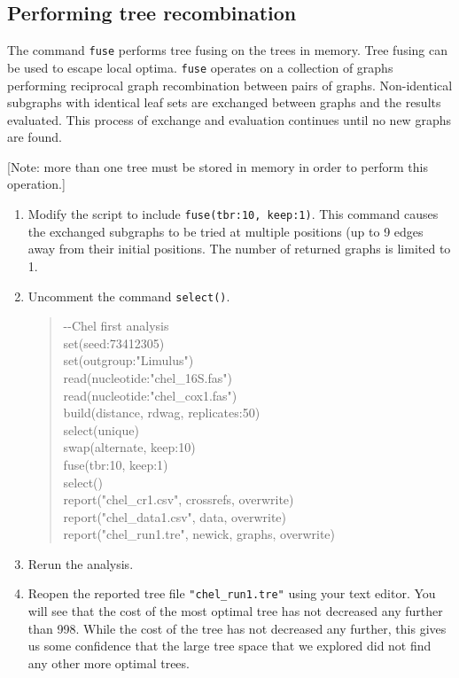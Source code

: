\documentclass[]{article}
\begin{document}
\subsection{Performing tree recombination}
\label{subsec:Fusing}

The command \texttt{fuse} performs tree fusing on the trees in memory. Tree 
fusing can be used to escape local optima. \texttt{fuse} operates on a collection 
of graphs performing reciprocal graph recombination between pairs of graphs. 
Non-identical subgraphs with identical leaf sets are exchanged between graphs 
and the results evaluated. This process of exchange and evaluation continues 
until no new graphs are found. 

[Note: more than one tree must be stored in 
memory in order to perform this operation.]

\begin{enumerate}

\item Modify the script to include \texttt{fuse(tbr:10, keep:1)}. This command 
causes the exchanged subgraphs to be tried at multiple positions (up to 9 
edges away from their initial positions. The number of returned graphs is 
limited to 1.

\item Uncomment the command \texttt{select()}.

	\begin{quote}
	-\/-Chel first analysis\\
	set(seed:73412305)\\
	set(outgroup:"Limulus")\\
	read(nucleotide:"chel\_16S.fas")\\
	read(nucleotide:"chel\_cox1.fas")\\
	build(distance, rdwag, replicates:50)\\
	select(unique)\\
	swap(alternate, keep:10)\\
	fuse(tbr:10, keep:1)\\
	select()\\
	report("chel\_cr1.csv", crossrefs, overwrite)\\
	report("chel\_data1.csv", data, overwrite)\\
	report("chel\_run1.tre", newick, graphs, overwrite)\\
	\end{quote}
	
\item Rerun the analysis.

\item Reopen the reported tree file \texttt{"chel\_run1.tre"} using your text editor.
You will see that the cost of the most optimal tree has not decreased any further 
than 998. While the cost of the tree has not decreased any further, this gives us
some confidence that the large tree space that we explored did not find any
other more optimal trees.

\end{enumerate}
\end{document}
